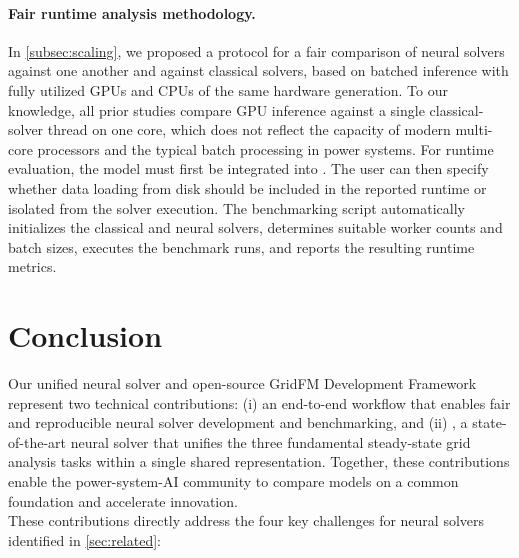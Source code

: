 \paragraph{Fair runtime analysis methodology.}
In \cref{subsec:scaling}, we proposed a protocol for a fair comparison of neural solvers against one another and against classical solvers, based on batched inference with fully utilized GPUs and CPUs of the same hardware generation. To our knowledge, all prior studies compare GPU inference against a single classical-solver thread on one core, which does not reflect the capacity of modern multi-core processors and the typical batch processing in power systems. For runtime evaluation, the model must first be integrated into \graphkit. The user can then specify whether data loading from disk should be included in the reported runtime or isolated from the solver execution. The benchmarking script automatically initializes the classical and neural solvers, determines suitable worker counts and batch sizes, executes the benchmark runs, and reports the resulting runtime metrics.





\section{Conclusion}
\label{sec:conclusion}

Our unified neural solver and open-source GridFM Development Framework represent two technical contributions: (i) an end-to-end workflow that enables fair and reproducible neural solver development and benchmarking, and (ii) \genco, a state-of-the-art neural solver that unifies the three fundamental steady-state grid analysis tasks within a single shared representation. Together, these contributions enable the power-system-AI community to compare models on a common foundation and accelerate innovation.\\ %

These contributions directly address the four key challenges for neural solvers identified in \cref{sec:related}:\\

